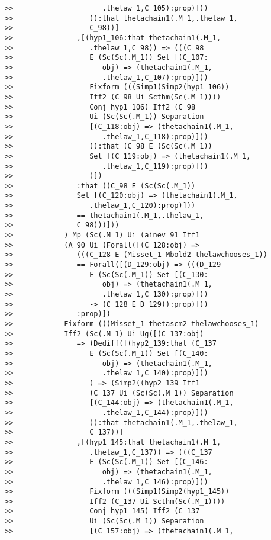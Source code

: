 \documentclass[12pt]{article}
\begin{document}
\begin{verbatim}
>>                     .thelaw_1,C_105):prop)]))
>>                  )):that thetachain1(.M_1,.thelaw_1,
>>                  C_98))]
>>               ,[(hyp1_106:that thetachain1(.M_1,
>>                  .thelaw_1,C_98)) => (((C_98
>>                  E (Sc(Sc(.M_1)) Set [(C_107:
>>                     obj) => (thetachain1(.M_1,
>>                     .thelaw_1,C_107):prop)]))
>>                  Fixform (((Simp1(Simp2(hyp1_106))
>>                  Iff2 (C_98 Ui Scthm(Sc(.M_1))))
>>                  Conj hyp1_106) Iff2 (C_98
>>                  Ui (Sc(Sc(.M_1)) Separation
>>                  [(C_118:obj) => (thetachain1(.M_1,
>>                     .thelaw_1,C_118):prop)]))
>>                  )):that (C_98 E (Sc(Sc(.M_1))
>>                  Set [(C_119:obj) => (thetachain1(.M_1,
>>                     .thelaw_1,C_119):prop)]))
>>                  )])
>>               :that ((C_98 E (Sc(Sc(.M_1))
>>               Set [(C_120:obj) => (thetachain1(.M_1,
>>                  .thelaw_1,C_120):prop)]))
>>               == thetachain1(.M_1,.thelaw_1,
>>               C_98)))]))
>>            ) Mp (Sc(.M_1) Ui (ainev_91 Iff1
>>            (A_90 Ui (Forall([(C_128:obj) =>
>>               (((C_128 E (Misset_1 Mbold2 thelawchooses_1))
>>               == Forall([(D_129:obj) => (((D_129
>>                  E (Sc(Sc(.M_1)) Set [(C_130:
>>                     obj) => (thetachain1(.M_1,
>>                     .thelaw_1,C_130):prop)]))
>>                  -> (C_128 E D_129)):prop)]))
>>               :prop)])
>>            Fixform (((Misset_1 thetascm2 thelawchooses_1)
>>            Iff2 (Sc(.M_1) Ui Ug([(C_137:obj)
>>               => (Dediff([(hyp2_139:that (C_137
>>                  E (Sc(Sc(.M_1)) Set [(C_140:
>>                     obj) => (thetachain1(.M_1,
>>                     .thelaw_1,C_140):prop)]))
>>                  ) => (Simp2((hyp2_139 Iff1
>>                  (C_137 Ui (Sc(Sc(.M_1)) Separation
>>                  [(C_144:obj) => (thetachain1(.M_1,
>>                     .thelaw_1,C_144):prop)]))
>>                  )):that thetachain1(.M_1,.thelaw_1,
>>                  C_137))]
>>               ,[(hyp1_145:that thetachain1(.M_1,
>>                  .thelaw_1,C_137)) => (((C_137
>>                  E (Sc(Sc(.M_1)) Set [(C_146:
>>                     obj) => (thetachain1(.M_1,
>>                     .thelaw_1,C_146):prop)]))
>>                  Fixform (((Simp1(Simp2(hyp1_145))
>>                  Iff2 (C_137 Ui Scthm(Sc(.M_1))))
>>                  Conj hyp1_145) Iff2 (C_137
>>                  Ui (Sc(Sc(.M_1)) Separation
>>                  [(C_157:obj) => (thetachain1(.M_1,

\end{verbatim}
\end{document}

